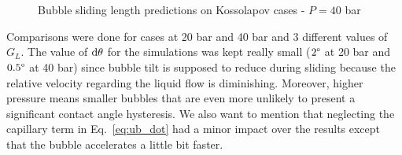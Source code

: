 \begin{figure}[h!]
\begin{center}
\\
\\
	\caption{Bubble sliding length predictions on Kossolapov cases - $P=40$ bar}	
	\label{fig:slide_koss_40bar}
\end{center}
\end{figure}

\npar

Comparisons were done for cases at 20 bar and 40 bar and 3 different values of $G_{L}$. The value of $\mathrm{d}\theta$ for the simulations was kept really small ($2 \degree$ at 20 bar and $0.5\degree$ at 40 bar) since bubble tilt is supposed to reduce during sliding because the relative velocity regarding the liquid flow is diminishing. Moreover, higher pressure means smaller bubbles that are even more unlikely to present a significant contact angle hysteresis. We also want to mention that neglecting the capillary term in Eq.~\ref{eq:ub_dot} had a minor impact over the results except that the bubble accelerates a little bit faster. 

